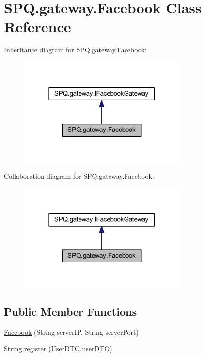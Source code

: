 \hypertarget{class_s_p_q_1_1gateway_1_1_facebook}{}\section{S\+P\+Q.\+gateway.\+Facebook Class Reference}
\label{class_s_p_q_1_1gateway_1_1_facebook}


Inheritance diagram for S\+P\+Q.\+gateway.\+Facebook\+:\nopagebreak
\begin{figure}[H]
\begin{center}
\leavevmode
\includegraphics[width=243pt]{class_s_p_q_1_1gateway_1_1_facebook__inherit__graph}
\end{center}
\end{figure}


Collaboration diagram for S\+P\+Q.\+gateway.\+Facebook\+:\nopagebreak
\begin{figure}[H]
\begin{center}
\leavevmode
\includegraphics[width=243pt]{class_s_p_q_1_1gateway_1_1_facebook__coll__graph}
\end{center}
\end{figure}
\subsection*{Public Member Functions}
\begin{DoxyCompactItemize}
\item 
\mbox{\hyperlink{class_s_p_q_1_1gateway_1_1_facebook_a428ab89808ef8f9d2d0ac5e60c9135e3}{Facebook}} (String server\+IP, String server\+Port)
\item 
String \mbox{\hyperlink{class_s_p_q_1_1gateway_1_1_facebook_aba03bc89c530d3f2159b3a1eb65c3427}{register}} (\mbox{\hyperlink{class_s_p_q_1_1dto_1_1_user_d_t_o}{User\+D\+TO}} user\+D\+TO)
\end{DoxyCompactItemize}


